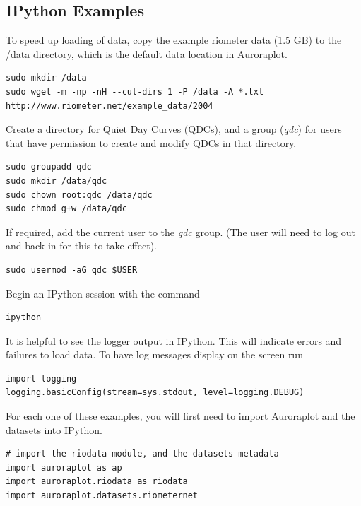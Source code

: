 \documentclass{article}
\begin{document}
\subsection{IPython Examples}

To speed up loading of data, copy the example riometer data (1.5 GB) to the /data directory, which is the default data location in Auroraplot.

\begin{lstlisting}
sudo mkdir /data
sudo wget -m -np -nH --cut-dirs 1 -P /data -A *.txt http://www.riometer.net/example_data/2004
\end{lstlisting}

Create a directory for Quiet Day Curves (QDCs), and a group ({\it qdc}) for users that have permission to create and modify QDCs in that directory.

\begin{lstlisting}
sudo groupadd qdc
sudo mkdir /data/qdc
sudo chown root:qdc /data/qdc
sudo chmod g+w /data/qdc
\end{lstlisting}

If required, add the current user to the {\it qdc} group. (The user will need to log out and back in for this to take effect).

\begin{lstlisting}
sudo usermod -aG qdc $USER
\end{lstlisting}

Begin an IPython session with the command

\begin{lstlisting}
ipython
\end{lstlisting}

It is helpful to see the logger output in IPython. This will indicate errors and failures to load data. To have log messages display on the screen run

\begin{lstlisting}[style=pythonstyle]
import logging
logging.basicConfig(stream=sys.stdout, level=logging.DEBUG)
\end{lstlisting}

For each one of these examples, you will first need to import Auroraplot and the datasets into IPython.

\begin{lstlisting}[style=pythonstyle]
# import the riodata module, and the datasets metadata
import auroraplot as ap
import auroraplot.riodata as riodata
import auroraplot.datasets.riometernet
\end{lstlisting}
\end{document}
